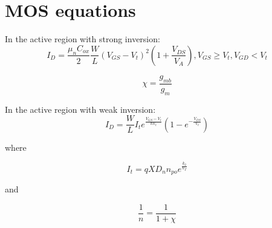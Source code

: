 \section*{MOS equations}

In the active region with strong inversion:
\begin{equation}
I_{D} = \frac{\mu_{n}C_{ox}}{2}\frac{W}{L}\left(V_{GS}-V_{t}\right)^{2}\left(1+\frac{V_{DS}}{V_{A}}\right), V_{GS} \geq V_{t}, V_{GD} < V_{t}
\label{eq:activeId}
\end{equation}

\begin{equation}
\chi = \frac{g_{mb}}{g_{m}}
\label{eq:chi}
\end{equation}

In the active region with weak inversion:
\begin{equation}
I_{D} = \frac{W}{L}I_{t}e^{\frac{V_{GS}-V_{t}}{nV_{t}}}\left(1-e^{-\frac{V_{DS}}{V_{t}}}\right)
\label{eq:Idweakinversion}
\end{equation}

\noindent where

\begin{equation}
I_{t} = qXD_{n}n_{po}e^{\frac{k_{2}}{V_{T}}}
\end{equation}

\noindent and

\begin{equation}
\frac{1}{n} = \frac{1}{1+\chi}
\label{eq:Id_n}
\end{equation}

